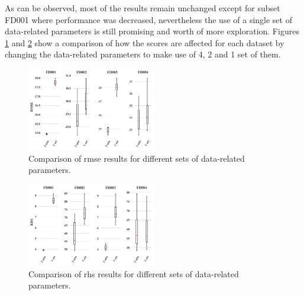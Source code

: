 \pagebreak

As can be observed, most of the results remain unchanged except for subset FD001 where performance was decreased, nevertheless the use of a single set of data-related parameters is still promising and worth of more exploration. Figures \ref{fig:scores_rmse} and \ref{fig:scores_rhs} show a comparison of how the scores are affected for each dataset by changing the data-related parameters to make use of 4, 2 and 1 set of them.

\begin{figure}[!htb]
\centering
\includegraphics[width=0.5\textwidth]{img/rmse_comparisson.png}
\caption{Comparison of \gls{rmse} results for different sets of data-related parameters.}
\label{fig:scores_rmse}
\end{figure}

\begin{figure}[!htb]
\centering
\includegraphics[width=0.5\textwidth]{img/rhs_comparisson.png}
\caption{Comparison of \gls{rhs} results for different sets of data-related parameters.}
\label{fig:scores_rhs}
\end{figure}